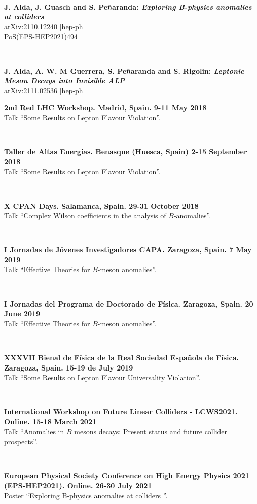 \documentclass{cvf}
\begin{document}
~

\textbf{J. Alda, J. Guasch and S. Peñaranda: \textit{Exploring B-physics anomalies at colliders}}\\
arXiv:2110.12240 [hep-ph]\\
PoS(EPS-HEP2021)494

~

\textbf{J. Alda, A. W. M Guerrera, S. Peñaranda and S. Rigolin: \textit{Leptonic Meson Decays into Invisible ALP}}\\
arXiv:2111.02536 [hep-ph]


\hspace{\parindent}\textbf{2nd Red LHC Workshop. Madrid, Spain. 9-11 May 2018}\\
Talk ``Some Results on Lepton Flavour Violation''.

~

\textbf{Taller de Altas Energías. Benasque (Huesca, Spain) 2-15 September 2018}\\
Talk ``Some Results on Lepton Flavour Violation''.

~

\textbf{X CPAN Days. Salamanca, Spain. 29-31 October 2018}\\
Talk ``Complex Wilson coefficients in the analysis of $B$-anomalies''.

~

\textbf{I Jornadas de Jóvenes Investigadores CAPA. Zaragoza, Spain. 7 May 2019}\\
Talk ``Effective Theories for $B$-meson anomalies''.

~

\textbf{I Jornadas del Programa de Doctorado de Física. Zaragoza, Spain. 20 June 2019}\\
Talk ``Effective Theories for $B$-meson anomalies''.

~

\textbf{XXXVII Bienal de Física de la Real Sociedad Española de Física. Zaragoza, Spain. 15-19 de July 2019}\\
Talk ``Some Results on Lepton Flavour Universality Violation''.

~

\textbf{International Workshop on Future Linear Colliders - LCWS2021. Online. 15-18 March 2021}\\
Talk ``Anomalies in $B$ mesons decays: Present status and future collider prospects''.

~

\textbf{European Physical Society Conference on High Energy Physics 2021 (EPS-HEP2021). Online. 26-30 July 2021}\\
Poster ``Exploring B-physics anomalies at colliders ''.
\end{document}
